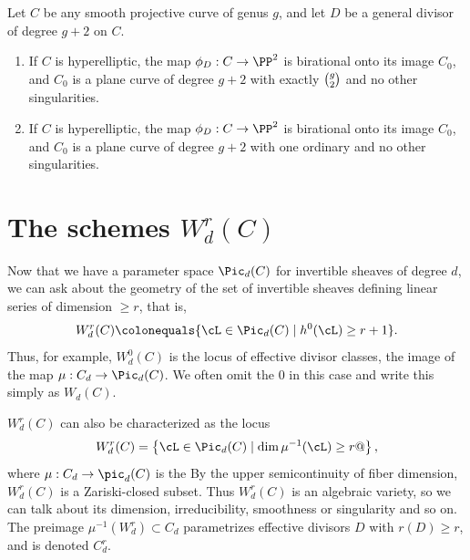 \begin{theorem}[$g+2$ theorem]\label{g+2 theorem}
Let $C$ be any smooth projective curve of genus $g$, and let $D$ be a general divisor of degree $g+2$ on $C$. 
%
\begin{enumerate}
\item If $C$ is 
hyperelliptic, the map $\phi_D : C \to \PP^2$ is birational onto its
image $C_0$, and $C_0$ is a plane curve of degree $g+2$ with exactly
$\tbinom{g}{2}$ 
%
and no other singularities.
\item If $C$ is hyperelliptic, the map $\phi_D : C \to \PP^2$ is
  birational onto its image $C_0$, and $C_0$ is a plane curve of
  degree $g+2$ with one ordinary 
%
 and no other
  singularities. 
\end{enumerate}
\end{theorem}

\section{The schemes $W^r_d(C)$}

Now that we have a parameter space $\Pic_d(C)$ for invertible sheaves
%
of degree $d$, we can ask about the geometry of the set of invertible
sheaves defining linear series of dimension $\geq r$, that is,
%
$$
W^r_d(C) \colonequals \{ \cL \in \Pic_d(C) \mid h^0(\cL) \geq r+1 \}.
$$
Thus, for example, $W^0_d(C)$ is the locus of effective divisor
classes, the image of the map $\mu : C_d \to \Pic_d(C)$. We often omit
the 0 in this case and write this simply as $W_d(C)$.

$W^r_d(C)$ can also be characterized as the locus
$$
W^r_d(C)= \left\{ \cL \in \Pic_d(C) \mid {\dim \mu^{-1}(\cL)} \geq r @\right\},
$$
where $\mu : C_d \to \pic_d(C)$ is the 
%
By the upper semicontinuity of fiber dimension, 
$W^r_d(C)$ is a Zariski-closed subset.
Thus $W^r_d(C)$ is an algebraic variety, so we can talk about its dimension, irreducibility, smoothness or singularity and so on. The preimage $\mu^{-1}(W^r_d) \subset C_d$ parametrizes effective divisors $D$ with $r(D) \geq r$, and is denoted $C^r_d$.
%

